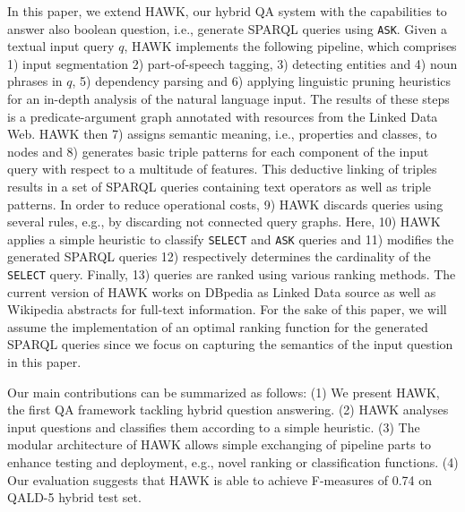 In this paper, we extend HAWK, our hybrid QA system with the capabilities to answer also boolean question, i.e., generate SPARQL queries using \texttt{ASK}.  %
Given a textual input query $q$, HAWK implements the following pipeline, which comprises 1) input segmentation 2) part-of-speech tagging, 3) detecting entities and 4) noun phrases in $q$, 5) dependency parsing and 6) applying linguistic pruning heuristics for an in-depth analysis of the natural language input. 
The results of these steps is a predicate-argument graph annotated with resources from the Linked Data Web. HAWK then 7) assigns semantic meaning, i.e., properties and classes, to nodes and 8) generates basic triple patterns for each component of the input query with respect to a multitude of features. 
This deductive linking of triples results in a set of SPARQL queries containing text operators as well as triple patterns.
In order to reduce operational costs, 9) HAWK discards queries using several rules, e.g., by discarding not connected query graphs.
Here, 10) HAWK applies a simple heuristic to classify \texttt{SELECT} and \texttt{ASK} queries and 11) modifies the generated SPARQL queries 12) respectively determines the cardinality of the \texttt{SELECT} query.
Finally, 13) queries are ranked using various ranking methods.
The current version of HAWK works on DBpedia as Linked Data source as well as Wikipedia abstracts for full-text information. 
For the sake of this paper, we will assume the implementation of an optimal ranking function for the generated SPARQL queries since we focus on capturing the semantics of the input question in this paper. 


Our main contributions can be summarized as follows: (1) We present HAWK, the first QA framework tackling hybrid question answering. (2) HAWK analyses input questions and classifies them according to a simple heuristic. (3) The modular architecture of HAWK allows simple exchanging of pipeline parts to enhance testing and deployment, e.g., novel ranking or classification functions. (4) Our evaluation suggests that HAWK is able to achieve F-measures of 0.74 on QALD-5 hybrid test set.

